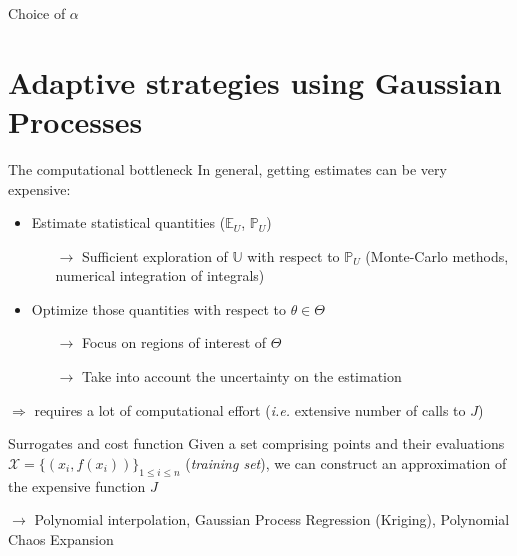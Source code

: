 \documentclass[10pt,aspectratio=169,usepdftitle=false]{beamer}
\newcommand{\Uspace}{\mathbb{U}}
\newcommand{\Kspace}{\Theta}
\newcommand{\Ex}{\mathbb{E}}
\newcommand{\Prob}{\mathbb{P}}
\newcommand{\kk}{\theta}
\newcommand{\UU}{U}
\begin{document}
\begin{frame}{Choice of $\alpha$}
  
\end{frame}



\section{Adaptive strategies using Gaussian Processes}
\begin{frame}{The computational bottleneck}
  In general, getting estimates can be very expensive:
  \begin{itemize}
  \item \alert{Estimate} statistical quantities ($\Ex_{\UU}$, $\Prob_{\UU}$)
    \begin{itemize}
    \item[$\rightarrow$] Sufficient exploration of $\Uspace$ with
      respect to $\Prob_{\UU}$ (Monte-Carlo methods, numerical
      integration of integrals)
 \end{itemize}
\item \alert{Optimize} those quantities with respect to $\kk\in\Kspace$
  \begin{itemize}
  \item[$\rightarrow$] Focus on regions of interest of $\Kspace$
  \item[$\rightarrow$] Take into account the uncertainty on the estimation
  \end{itemize}
    \end{itemize}
  $\Rightarrow$ requires a lot of computational effort (\emph{i.e.} extensive number of calls to $J$)
\end{frame}

\begin{frame}{Surrogates and cost function}
  Given a set comprising points and their evaluations
  $\mathcal{X} = \{(x_i,f(x_i))\}_{1 \leq i \leq n}$ (\textit{training set}), we can construct
  an \alert{approximation} of the expensive function $J$

  
  $\rightarrow$ Polynomial interpolation, \alert<2>{Gaussian Process Regression (Kriging)}, Polynomial Chaos Expansion
\end{frame}
\end{document}
